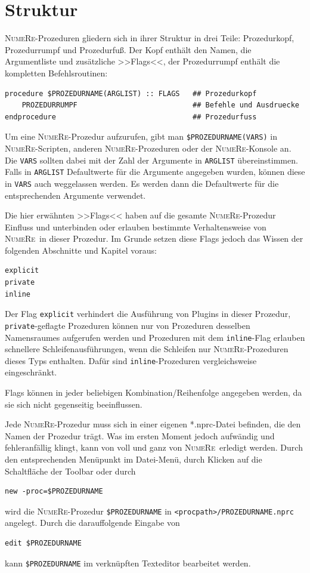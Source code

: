 \documentclass[DIV=14,headsepline,footsepline]{scrbook}
\newcommand{\NR}{\textsc{Nu\-me\-Re}}
\begin{document}
			\section{Struktur}
				\NR-Prozeduren gliedern sich in ihrer Struktur in drei Teile: Prozedurkopf, Prozedurrumpf und Prozedurfuß. Der Kopf enthält den Namen, die Argumentliste und zusätzliche >>Flags<<, der Prozedurrumpf enthält die kompletten Befehlsroutinen:
				\begin{lstlisting}
procedure $PROZEDURNAME(ARGLIST) :: FLAGS   ## Prozedurkopf
	PROZEDURRUMPF                           ## Befehle und Ausdruecke
endprocedure                                ## Prozedurfuss
				\end{lstlisting}
				Um eine \NR-Prozedur aufzurufen, gibt man \verb+$PROZEDURNAME(VARS)+ in \NR-Scrip\-ten, anderen \NR-Prozeduren oder der \NR-Konsole an. Die \verb+VARS+ sollten dabei mit der Zahl der Argumente in \verb+ARGLIST+ übereinstimmen. Falls in \verb+ARGLIST+ Defaultwerte für die Argumente angegeben wurden, können diese in \verb+VARS+ auch weggelassen werden. Es werden dann die Defaultwerte für die entsprechenden Argumente verwendet.
				
				Die hier erwähnten >>Flags<< haben auf die gesamte \NR-Prozedur Einfluss und unterbinden oder erlauben bestimmte Verhaltensweise von \NR\ in dieser Prozedur. Im Grunde setzen diese Flags jedoch das Wissen der folgenden Abschnitte und Kapitel voraus:
				\begin{lstlisting}
explicit
private
inline
				\end{lstlisting}
				Der Flag \verb+explicit+ verhindert die Ausführung von Plugins in dieser Prozedur, \verb+private+-geflagte Prozeduren können nur von Prozeduren desselben Namensraumes aufgerufen werden und Prozeduren mit dem \verb+inline+-Flag erlauben schnellere Schleifenausführungen, wenn die Schleifen nur \NR-Pro\-ze\-du\-ren dieses Typs enthalten. Dafür sind \verb+inline+-Pro\-ze\-du\-ren vergleichsweise eingeschränkt.
				
				Flags können in jeder beliebigen Kombination/Reihenfolge angegeben werden, da sie sich nicht gegenseitig beeinflussen.
				
				Jede \NR-Prozedur muss sich in einer eigenen *.nprc-Datei befinden, die den Namen der Prozedur trägt. Was im ersten Moment jedoch aufwändig und fehleranfällig klingt, kann von voll und ganz von \NR\ erledigt werden. Durch den entsprechenden Menüpunkt im Datei-Menü, durch Klicken auf die Schaltfläche der Toolbar oder durch
				\begin{lstlisting}
new -proc=$PROZEDURNAME
				\end{lstlisting}
				wird die \NR-Prozedur \verb+$PROZEDURNAME+ in \verb+<procpath>/PROZEDURNAME.nprc+ angelegt. Durch die darauffolgende Eingabe von
				\begin{lstlisting}
edit $PROZEDURNAME
				\end{lstlisting}
				kann \verb+$PROZEDURNAME+ im verknüpften Texteditor bearbeitet werden.
				
\end{document}
